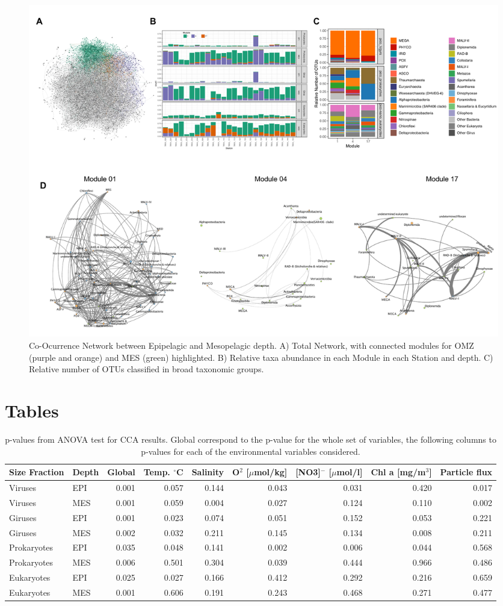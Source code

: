 \documentclass[fleqn,10pt]{wlscirep}
\begin{document}
\clearpage
\begin{figure}[ht]
    \centering
    \includegraphics[scale=0.5]{images/Networks_Composite_v3.pdf}
    \caption{Co-Ocurrence Network between Epipelagic and Mesopelagic depth. A) Total Network, with connected modules for OMZ (purple and orange) and MES (green) highlighted. B) Relative taxa abundance in each Module in each Station and depth. C) Relative number of OTUs classified in broad taxonomic groups.}
    \label{fig:networks}
\end{figure}
\clearpage

\section*{Tables}

\begin{table}[ht]
\centering
\begin{tabular}{llrrrrrrr}
\hline
 Size Fraction& Depth & Global & Temp. $^\circ$C & Salinity & O$^2$ [$\mu$mol/kg] &[NO3]$^-$  [$\mu$mol/l]	& Chl a [mg/m$^3$] &	 Particle flux\\
\hline
\hline
Viruses & EPI & 0.001 & 0.057 & 0.144 & 0.043 & 0.031 & 0.420 & 0.017\\
Viruses & MES & 0.001 & 0.059 & 0.004 & 0.027 & 0.124 & 0.110 & 0.002\\
Giruses & EPI & 0.001 & 0.023 & 0.074 & 0.051 & 0.152 & 0.053 & 0.221\\
Giruses & MES & 0.002 & 0.032 & 0.211 & 0.145 & 0.134 & 0.008 & 0.211\\
Prokaryotes & EPI & 0.035 & 0.048 & 0.141 & 0.002 & 0.006 & 0.044 & 0.568\\
Prokaryotes & MES & 0.006 & 0.501 & 0.304 & 0.039 & 0.444 & 0.966 & 0.486\\
Eukaryotes & EPI & 0.025 & 0.027 & 0.166 & 0.412 & 0.292 & 0.216 & 0.659\\
Eukaryotes & MES & 0.001 & 0.606 & 0.191 & 0.243 & 0.468 & 0.271 & 0.477\\
\hline
\hline
\end{tabular}
\caption{\label{tab:CCA} p-values from ANOVA test for CCA results. Global correspond to the p-value for the whole set of variables, the following columns to p-values for each of the environmental variables considered.}
\end{table}
\end{document}
